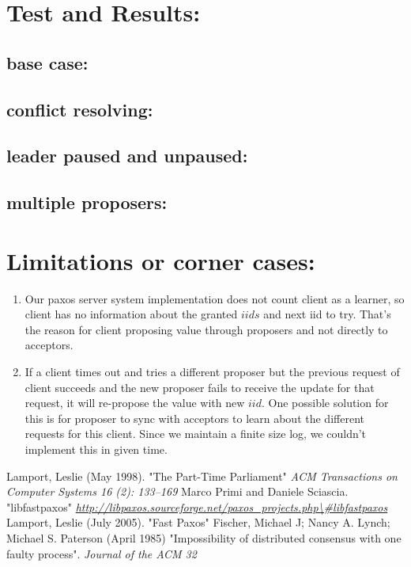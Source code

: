 \section{Test and Results:}
\subsection{base case:}
\subsection{conflict resolving:}
\subsection{leader paused and unpaused:}
\subsection{multiple proposers:}

\section{Limitations or corner cases:}
\begin{enumerate}
\item Our paxos server system implementation does not count client as a learner, so client has no information about the granted $iids$ and next iid to try. That's the reason for client proposing value through proposers and not directly to acceptors.

\item If a client times out and tries a different proposer but the previous request of client succeeds and the new proposer fails to receive the update for that request, it will re-propose the value with new $iid$. One possible solution for this is for proposer to sync with acceptors to learn about the different requests for this client. Since we maintain a finite size log, we couldn't implement this in given time.
\end{enumerate}

\begin{thebibliography}{100} 
 Lamport, Leslie (May 1998). "The Part-Time Parliament" \emph{ ACM Transactions on Computer Systems 16 (2): 133–169}
 Marco Primi and Daniele Sciascia. "libfastpaxos" \emph{\url{http://libpaxos.sourceforge.net/paxos_projects.php\\#libfastpaxos}}
 Lamport, Leslie (July 2005). "Fast Paxos" \emph{}
 Fischer, Michael J; Nancy A. Lynch; Michael S. Paterson (April 1985)  "Impossibility of distributed consensus with one faulty process". \emph{Journal of the ACM 32}
\end{thebibliography} 

